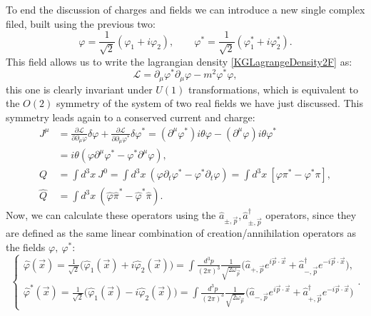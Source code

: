 To end the discussion of charges and fields we can introduce a new single complex filed, built using the previous two:
\begin{equation*}
    \varphi=\frac{1}{\sqrt{2}}(\varphi_1+i\varphi_2),\qquad \varphi^*=\frac{1}{\sqrt{2}}(\varphi_1^*+i\varphi_2^*).
\end{equation*}
This field allows us to write the lagrangian density \eqref{KGLagrangeDensity2F} as:
\begin{equation}\label{KGLagrDensityComplex}
    \mathcal{L}=\partial_\mu\varphi^*\partial_\mu\varphi-m^2\varphi^*\varphi,
\end{equation}
this one is clearly invariant under $U(1)$ transformations, which is equivalent to the $O(2)$ symmetry of the system of two real fields we have just discussed. This symmetry leads again to a conserved current and charge:
\begin{align*}
    J^\mu&=\frac{\partial \mathcal{L} }{\partial\partial_\mu\varphi}\delta\varphi+\frac{\partial \mathcal{L} }{\partial\partial_\mu\varphi^*}\delta\varphi^*=(\partial^\mu\varphi^*)i\theta\varphi-(\partial^\mu\varphi)i\theta\varphi^*\\ &=i\theta(\varphi\partial^\mu\varphi^*-\varphi^*\partial^\mu\varphi),\\
    Q&=\int d^3x\ J^0=\int d^3x\ (\varphi\partial_t\varphi^*-\varphi^*\partial_t\varphi)=\int d^3x\ [\varphi\pi^*-\varphi^*\pi],\\
    \hat Q&=\int d^3x\ (\hat\varphi\hat\pi^*-\hat\varphi^*\hat\pi).
\end{align*}
Now, we can calculate these operators using the $\hat{a}_{\pm,\vec p}, \hat{a}^\dagger_{\pm,\vec p}$ operators, since they are defined as the same linear combination of creation/annihilation operators as the fields $\varphi,\ \varphi^*$:
\begin{equation*}
    \begin{cases*}
        \hat\varphi(\vec x)=\frac{1}{\sqrt{2}}\big(\hat\varphi_1(\vec x )+i\hat\varphi_2(\vec x )\big)=\int\frac{d^3p}{(2\pi)^3}\frac{1}{\sqrt{2\omega_{\vec{p}}}}\bigg(\hat{a}_{+,\vec p}e^{i\vec p\cdot\vec x}+\hat{a}^\dagger_{-,\vec p}e^{-i\vec p\cdot\vec x}\bigg),\\
        \hat\varphi^*(\vec x)=\frac{1}{\sqrt{2}}\big(\hat\varphi_1(\vec x )-i\hat\varphi_2(\vec x )\big)=\int\frac{d^3p}{(2\pi)^3}\frac{1}{\sqrt{2\omega_{\vec{p}}}}\bigg(\hat{a}_{-,\vec p}e^{i\vec p\cdot\vec x}+\hat{a}^\dagger_{+,\vec p}e^{-i\vec p\cdot\vec x}\bigg)
    \end{cases*}.
\end{equation*}
